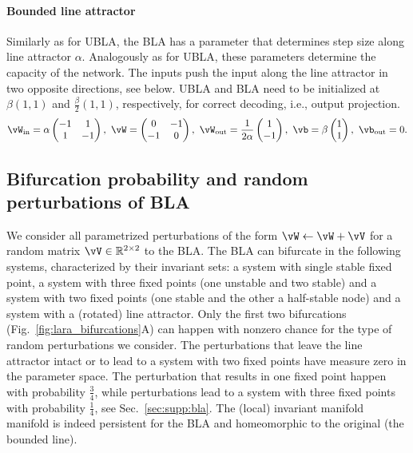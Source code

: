 \documentclass{article} %
\newcounter{ct}
\newcommand{\win}{\vW_{\text{in}}}
\newcommand{\wout}{\vW_{\text{out}}}
\newcommand{\bout}{\vb_{\text{out}}}
\theoremstyle{definition}
\theoremstyle{remark}
\begin{document}
\paragraph{Bounded line attractor}\label{sec:bla}
Similarly as for UBLA, the BLA has a parameter that determines step size along line attractor $\alpha$. Analogously as for UBLA, these parameters determine the capacity of the network.
The inputs push the input along the line attractor in two opposite directions, see below. UBLA and BLA need to be initialized at $\beta(1,1)$ and $\tfrac{\beta}{2}(1,1)$, respectively, for correct decoding, i.e., output projection.
\begin{equation}\label{eq:bla}
\win = \alpha
\begin{pmatrix}
-1  &  1 \\
1  &  -1
\end{pmatrix}, \
\vW = 
\begin{pmatrix}
0  &  -1 \\
-1  &  0
\end{pmatrix}, \
\wout = \frac{1}{2\alpha}
\begin{pmatrix}
1  \\  -1 
\end{pmatrix}, \
\vb = \beta
\begin{pmatrix}
1 \\  1 
\end{pmatrix}, \
\bout = 0.
\end{equation}



\subsection{Bifurcation probability and random perturbations of BLA}
We consider all parametrized perturbations of the form $ \vW \leftarrow \vW + \vV$ for a random matrix $\vV\in \mathbb{R}^{2\times 2}$ to the BLA.
The BLA can bifurcate in the following systems, characterized by their invariant sets: a system with single stable fixed point, a system with three fixed points (one unstable and two stable) and  a system with two fixed points (one stable and the other a half-stable node) and a system with a (rotated) line attractor. 
Only the first two bifurcations (Fig.~\ref{fig:lara_bifurcations}A) can happen with nonzero chance for the type of random perturbations we consider.
The perturbations that leave the line attractor intact or to lead to a system with two fixed points have measure zero in the parameter space.
The perturbation that results in one fixed point happen with probability $\frac{3}{4}$, while perturbations lead to a system with three fixed points with probability $\frac{1}{4}$, see Sec.~\ref{sec:supp:bla}.
The (local) %
 invariant manifold manifold is indeed persistent for the BLA and homeomorphic to the original (the bounded line).
\end{document}

